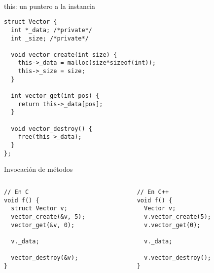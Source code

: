 ~%
\begin{frame}[fragile]{this: un puntero a la instancia}
        \begin{lstlisting}[style=normal,firstnumber=1,linebackgroundcolor={%
                 \btLstHLB<1>{5,10,14}%
         }]
struct Vector {
  int *_data; /*private*/
  int _size; /*private*/

  void vector_create(int size) {
    this->_data = malloc(size*sizeof(int));
    this->_size = size;
  }

  int vector_get(int pos) {
    return this->_data[pos];
  }

  void vector_destroy() {
    free(this->_data);
  }
};
        \end{lstlisting}
\end{frame}

\begin{frame}[fragile]{Invocaci\'on de m\'etodos}
   \begin{columns}[t]
      \begin{column}{.4\linewidth}
         \begin{lstlisting}[style=normal,firstnumber=14]
// En C
void f() {
  struct Vector v;
  vector_create(&v, 5);
  vector_get(&v, 0);

  v._data;

  vector_destroy(&v);
}
         \end{lstlisting}
     \end{column}
      \begin{column}{.4\linewidth}
        \begin{lstlisting}[style=normal,firstnumber=14]
// En C++
void f() {
  Vector v;
  v.vector_create(5);
  v.vector_get(0);

  v._data;

  v.vector_destroy();
}
        \end{lstlisting}
    \end{column}
\end{columns}
\end{frame}

